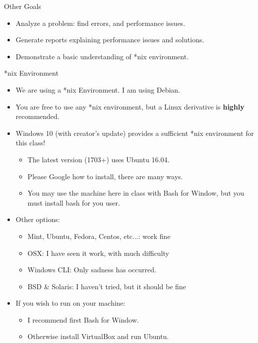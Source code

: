 \documentclass{beamer}
\begin{document}
\begin{frame}{Other Goals}
\begin{itemize}
\item Analyze a problem: find errors, and performance issues.
\item Generate reports explaining performance issues and solutions.
\item Demonstrate a basic understanding of *nix environment.
\end{itemize}
\end{frame}

\begin{frame}{*nix Environment}
\begin{itemize}
\item We are using a *nix Environment.  I am using Debian.
\item You are free to use any *nix environment, but a Linux derivative is \textbf{highly} recommended.
\item Windows 10 (with creator's update) provides a sufficient *nix environment for this class!
\begin{itemize}
\item The latest version (1703+) uses Ubuntu 16.04.
\item Please Google how to install, there are many ways.
\item You may use the machine here in class with Bash for Window, but you must install bash for you user.
\end{itemize}
\item Other options:
\begin{itemize}
\item Mint, Ubuntu, Fedora, Centos, etc...: work fine
\item OSX: I have seen it work, with much difficulty
\item Windows CLI: Only sadness has occurred.
\item BSD \& Solaris: I haven't tried, but it should be fine
\end{itemize}
\item If you wish to run on your machine:
\begin{itemize}
\item I recommend first Bash for Window.
\item Otherwise install VirtualBox and run Ubuntu.
\end{itemize}
\end{itemize}
\end{frame}
\end{document}
